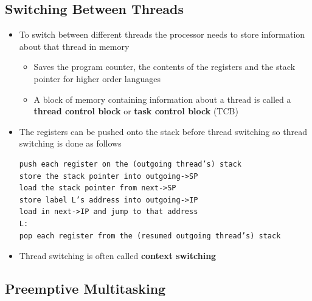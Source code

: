 \documentclass[11pt]{article}
\providecommand{\tightlist}{%
      \setlength{\itemsep}{0pt}\setlength{\parskip}{0pt}}
\begin{document}
    \subsection{Switching Between Threads}\label{switching-between-threads}

\begin{itemize}
\item
  To switch between different threads the processor needs to store
  information about that thread in memory

  \begin{itemize}
  \tightlist
  \item
    Saves the program counter, the contents of the registers and the
    stack pointer for higher order languages
  \item
    A block of memory containing information about a thread is called a
    \textbf{thread control block} or \textbf{task control block} (TCB)
  \end{itemize}
\item
  The registers can be pushed onto the stack before thread switching so
  thread switching is done as follows

\begin{verbatim}
push each register on the (outgoing thread’s) stack
store the stack pointer into outgoing->SP
load the stack pointer from next->SP
store label L’s address into outgoing->IP
load in next->IP and jump to that address
L:
pop each register from the (resumed outgoing thread’s) stack
\end{verbatim}
\item
  Thread switching is often called \textbf{context switching}
\end{itemize}

    \subsection{Preemptive Multitasking}\label{preemptive-multitasking}
\end{document}
